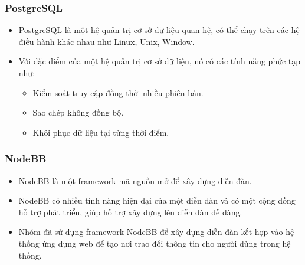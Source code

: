 \documentclass[a4paper,12pt,oneside]{article}
\begin{document}
\subsubsection{PostgreSQL \cite{sql}}
\begin{itemize}
\item PostgreSQL là một hệ quản trị cơ sở dữ liệu quan hệ, có thể chạy trên các hệ điều hành khác nhau như Linux, Unix, Window.
\item Với đặc điểm của một hệ quản trị cơ sở dữ liệu, nó có các tính năng phức tạp như:
\begin{itemize}
\item Kiểm soát truy cập đồng thời nhiều phiên bản.
\item Sao chép không đồng bộ.
\item Khôi phục dữ liệu tại từng thời điểm.
\end{itemize}
\end{itemize}

\subsubsection{NodeBB \cite{nodebb}}
\begin{itemize}
\item NodeBB là một framework mã nguồn mở để xây dựng diễn đàn.
\item NodeBB có nhiều tính năng hiện đại của một diễn đàn và có một cộng đồng hỗ trợ phát triển, giúp hỗ trợ xây dựng lên diễn đàn dễ dàng. 
\item Nhóm đã sử dụng framework NodeBB để xây dựng diễn đàn kết hợp vào hệ thống ứng dụng web để tạo nơi trao đổi thông tin cho người dùng trong hệ thống.
\end{itemize}
\end{document}
